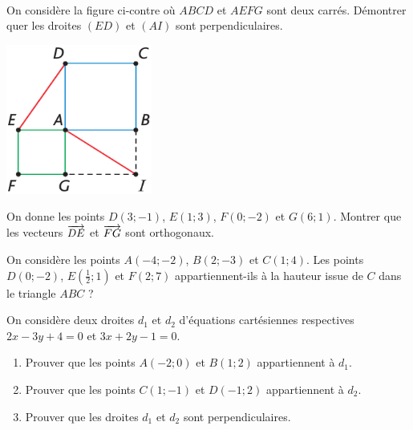 \documentclass[11pt]{article}
\begin{document}
\begin{exo}~\\[-8mm]
  \begin{minipage}[]{.5\textwidth}
    On considère la figure ci-contre où $ABCD$ et $AEFG$ sont deux carrés.
    Démontrer quer les droites $(ED)$ et $(AI)$ sont perpendiculaires.
  \end{minipage}
  \begin{minipage}[]{.5\textwidth}
    \begin{center}
      \includegraphics[scale=.5]{initiative.png}
    \end{center}
  \end{minipage}
\end{exo}

\setcounter{exo}{0}
\begin{exo}
  On donne les points $D(3; -1)$, $E(1; 3)$, $F(0; -2)$ et $G(6; 1)$. Montrer
  que les vecteurs $\overrightarrow{DE}$ et $\overrightarrow{FG}$ sont orthogonaux.
\end{exo}

\begin{exo}
  On considère les points $A(-4; -2)$, $B(2; -3)$ et $C(1; 4)$. Les points
  $D(0; -2)$, $E\left( \frac{1}{2};1 \right)$ et $F(2; 7)$ appartiennent-ils à
  la hauteur issue de $C$ dans le triangle $ABC$ ?
\end{exo}

\begin{exo}
  On considère deux droites $d_1$ et $d_2$ d'équations cartésiennes respectives
  $2x-3y+4=0$ et $3x+2y-1=0$.
  \begin{enumerate}
    \item Prouver que les points $A(-2; 0)$ et $B(1; 2)$ appartiennent à $d_1$.
    \item Prouver que les points $C(1; -1)$ et $D(-1; 2)$ appartiennent à $d_2$.
    \item Prouver que les droites $d_1$ et $d_2$ sont perpendiculaires.
  \end{enumerate}
\end{exo}
\end{document}
